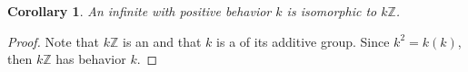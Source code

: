 \documentclass[12pt]{article}
\newtheorem*{cor*}{Corollary}
\begin{document}
\begin{cor*}
An infinite  with positive behavior $k$ is isomorphic to $k\mathbb{Z}$.
\end{cor*}

\begin{proof}
Note that $k\mathbb{Z}$ is an  and that $k$ is a  of its additive group.  Since $k^2=k(k)$, then $k\mathbb{Z}$ has behavior $k$.
\end{proof}
\end{document}

